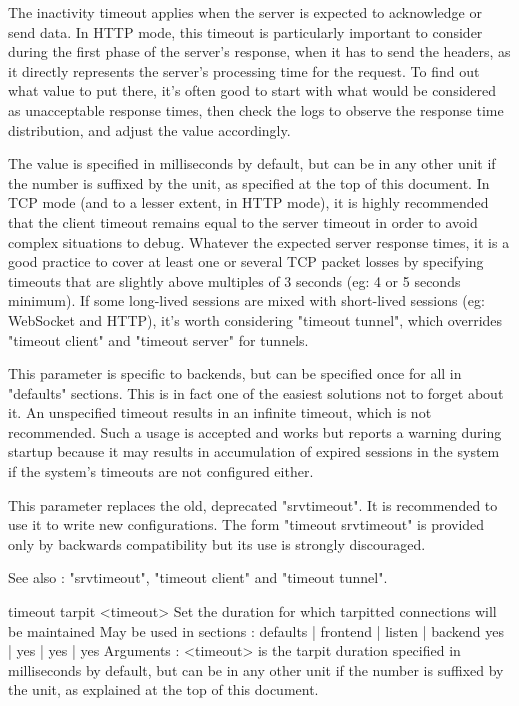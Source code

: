   The inactivity timeout applies when the server is expected to acknowledge or
  send data. In HTTP mode, this timeout is particularly important to consider
  during the first phase of the server's response, when it has to send the
  headers, as it directly represents the server's processing time for the
  request. To find out what value to put there, it's often good to start with
  what would be considered as unacceptable response times, then check the logs
  to observe the response time distribution, and adjust the value accordingly.

  The value is specified in milliseconds by default, but can be in any other
  unit if the number is suffixed by the unit, as specified at the top of this
  document. In TCP mode (and to a lesser extent, in HTTP mode), it is highly
  recommended that the client timeout remains equal to the server timeout in
  order to avoid complex situations to debug. Whatever the expected server
  response times, it is a good practice to cover at least one or several TCP
  packet losses by specifying timeouts that are slightly above multiples of 3
  seconds (eg: 4 or 5 seconds minimum). If some long-lived sessions are mixed
  with short-lived sessions (eg: WebSocket and HTTP), it's worth considering
  "timeout tunnel", which overrides "timeout client" and "timeout server" for
  tunnels.

  This parameter is specific to backends, but can be specified once for all in
  "defaults" sections. This is in fact one of the easiest solutions not to
  forget about it. An unspecified timeout results in an infinite timeout, which
  is not recommended. Such a usage is accepted and works but reports a warning
  during startup because it may results in accumulation of expired sessions in
  the system if the system's timeouts are not configured either.

  This parameter replaces the old, deprecated "srvtimeout". It is recommended
  to use it to write new configurations. The form "timeout srvtimeout" is
  provided only by backwards compatibility but its use is strongly discouraged.

  See also : "srvtimeout", "timeout client" and "timeout tunnel".


timeout tarpit <timeout>
  Set the duration for which tarpitted connections will be maintained
  May be used in sections :   defaults | frontend | listen | backend
                                 yes   |    yes   |   yes  |   yes
  Arguments :
    <timeout> is the tarpit duration specified in milliseconds by default, but
              can be in any other unit if the number is suffixed by the unit,
              as explained at the top of this document.

